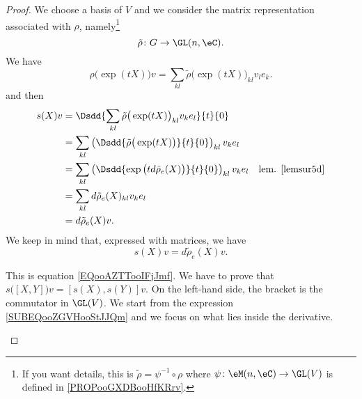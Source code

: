 \begin{proof}
	We choose a basis of \( V\) and we consider the matrix representation associated with \( \rho\), namely\footnote{If you want details, this is \( \tilde \rho=\psi^{-1}\circ\rho\) where \( \psi\colon \eM(n,\eC)\to \GL(V)\) is defined in \ref{PROPooGXDBooHfKRrv}.}
	\begin{equation}
		\tilde \rho\colon G\to \GL(n,\eC).
	\end{equation}
	We have
	\begin{equation}
		\rho\big( \exp(tX) \big)v=\sum_{kl}\tilde \rho\big( \exp(tX) \big)_{kl}v_le_k.
	\end{equation}
	and then
	\begin{subequations}
		\begin{align}
			s(X)v & =\Dsdd{ \sum_{kl}\tilde \rho\big( \exp(tX) \big)_{kl}v_ke_l }{t}{0}                                                                             \\
			      & =\sum_{kl}\left( \Dsdd{ \tilde \rho\big( \exp(tX) \big) }{t}{0}\right)_{kl}v_ke_l      \label{SUBEQooZGVHooStJJQm}                              \\
			      & =\sum_{kl}\left( \Dsdd{  \exp\big( td\tilde \rho_e(X) \big)  }{t}{0}\right)_{kl}v_ke_l                             & \text{lem. \ref{lemsur5d}} \\
			      & =\sum_{kl}d\tilde \rho_e(X)_{kl}v_ke_l                                                                                                          \\
			      & =d\tilde \rho_e(X)v.
		\end{align}
	\end{subequations}
	We keep in mind that, expressed with matrices, we have
	\begin{equation}    \label{EQooAZTTooIFjJmf}
		s(X)v=d\tilde \rho_e(X)v.
	\end{equation}

	\begin{subproof}
		\spitem[\( s\) is linear]
		This is equation \eqref{EQooAZTTooIFjJmf}.
		We have to prove that \( s\big( [X,Y] \big)v=[s(X),s(Y)]v\). On the left-hand side, the bracket is the commutator in \( \GL(V)\). We start from the expression \eqref{SUBEQooZGVHooStJJQm} and we focus on what lies inside the derivative.


\end{subproof}
\end{proof}
